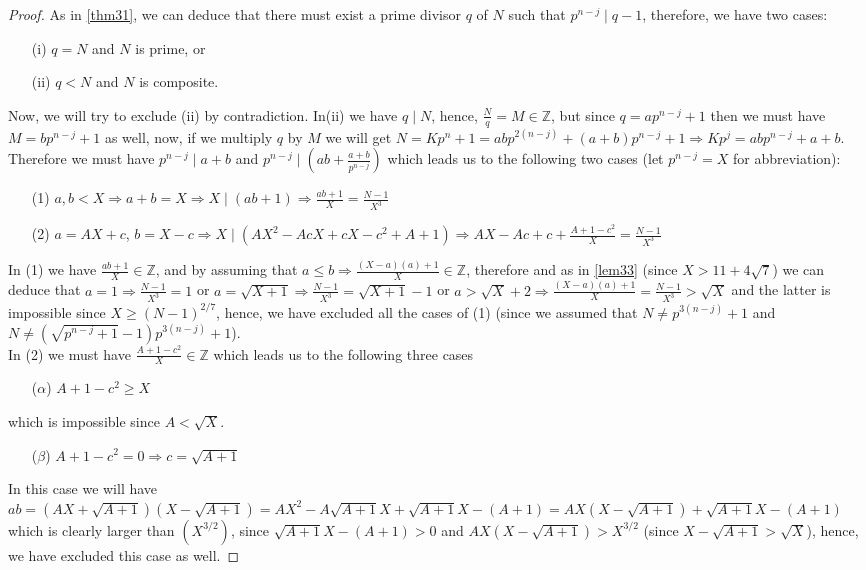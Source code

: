 \documentclass[10pt,a4paper]{amsart}
\begin{document}
\begin{proof}
	As in \ref{thm31}, we can deduce that there must exist a prime divisor $q$ of $N$ such that $p^{n-j} \mid q-1$, therefore, we have two cases:
	\begin{enumerate}
		\item[(i)] $q=N$ and $N$ is prime, or
		\item[(ii)] $q < N$ and $N$ is composite.
	\end{enumerate}
	Now, we will try to exclude (ii) by contradiction. In(ii) we have $q \mid N$, hence, $\frac{N}{q}=M \in \mathbb{Z}$, but since $q=ap^{n-j}+1$ then we must have $M=bp^{n-j}+1$ as well, now, if we multiply $q$ by $M$ we will get $N=Kp^n+1=abp^{2(n-j)}+(a+b)p^{n-j}+1 \Longrightarrow Kp^{j}=abp^{n-j}+a+b$. Therefore we must have $p^{n-j} \mid a+b$ and $p^{n-j} \mid (ab+\frac{a+b}{p^{n-j}})$ which leads us to the following two cases (let $p^{n-j}=X$ for abbreviation):
	\begin{enumerate}
		\item[(1)] $a,b <X \Longrightarrow a+b=X \Longrightarrow X \mid (ab+1) \Longrightarrow \frac{ab+1}{X}=\frac{N-1}{X^3}$
		\item[(2)] $a=AX+c$, $b=X-c \Longrightarrow  X \mid (AX^2 - AcX + cX -c^2 + A + 1) \Longrightarrow AX - Ac + c + \frac{A + 1 - c^2}{X}=\frac{N-1}{X^3}$
	\end{enumerate}
	In (1) we have $\frac{ab+1}{X} \in \mathbb{Z}$, and by assuming that $a \le b \Longrightarrow \frac{(X-a)(a)+1}{X} \in \mathbb{Z}$, therefore and as in \ref{lem33} (since $X > 11+4\sqrt{7}$) we can deduce that $a=1 \Longrightarrow \frac{N-1}{X^3}=1$ or $a=\sqrt{X+1} \Longrightarrow \frac{N-1}{X^3}=\sqrt{X+1}-1$ or $a > \sqrt{X}+2 \Longrightarrow \frac{(X-a)(a)+1}{X} = \frac{N-1}{X^3} > \sqrt{X}$ and the latter is impossible since $X \ge (N-1)^{2/7}$, hence, we have excluded all the cases of (1) (since we assumed that $N \neq p^{3(n-j)}+1$ and $N \neq (\sqrt{p^{n-j}+1}-1)p^{3(n-j)}+1$).
	\\
	In (2) we must have $\frac{A + 1 - c^2}{X} \in \mathbb{Z}$ which leads us to the following three cases
	\begin{enumerate}
		\item[($\alpha$)] $A + 1 - c^2 \ge X$
	\end{enumerate}
	which is impossible since $A < \sqrt{X}$.
	\begin{enumerate}
		\item[($\beta$)] $A+1-c^2=0 \Longrightarrow c = \sqrt{A+1}$
	\end{enumerate}
	In this case we will have $ab=(AX+\sqrt{A+1})(X-\sqrt{A+1})=AX^2-A \sqrt{A+1} X + \sqrt{A+1} X -(A+1)= AX(X-\sqrt{A+1}) + \sqrt{A+1}X-(A+1)$ which is clearly larger than $(X^{3/2})$, since $\sqrt{A+1}X-(A+1) > 0$ and $AX(X-\sqrt{A+1}) > X^{3/2}$ (since $ X-\sqrt{A+1} > \sqrt{X}$), hence, we have excluded this case as well.
	

\end{proof}
\end{document}
